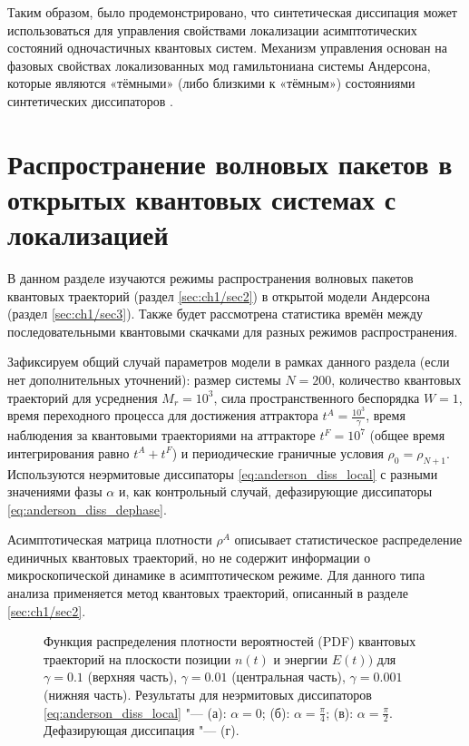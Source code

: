Таким образом, было продемонстрировано, что синтетическая диссипация может использоваться для управления свойствами локализации асимптотических состояний одночастичных квантовых систем. Механизм управления основан на фазовых свойствах локализованных мод гамильтониана системы Андерсона, которые являются  «тёмными» (либо близкими к «тёмным») состояниями синтетических диссипаторов \cite{Vershinina2017}.

\section{Распространение волновых пакетов в открытых квантовых системах с локализацией}\label{sec:ch1/prb_jump}
В данном разделе изучаются режимы распространения волновых пакетов квантовых траекторий \cite{Dalibard1992, Dum1992, Plenio1998} (раздел \cref{sec:ch1/sec2}) в открытой модели Андерсона (раздел \cref{sec:ch1/sec3}). Также будет рассмотрена статистика времён между последовательными квантовыми скачками для разных режимов распространения.

Зафиксируем общий случай параметров модели в рамках данного раздела (если нет дополнительных уточнений): размер системы \(N=200\), количество квантовых траекторий для усреднения \(M_r=10^3\), сила пространственного беспорядка \(W=1\), время переходного процесса для достижения аттрактора \(t^A = \frac{10^3}{\gamma}\), время наблюдения за квантовыми траекториями на аттракторе \(t^F = 10^7\) (общее время интегрирования равно \(t^A + t^F\)) и периодические граничные условия \(\rho_0 = \rho_{N+1}\). Используются неэрмитовые диссипаторы \cref{eq:anderson_diss_local} с разными значениями фазы \(\alpha\) и, как контрольный случай, дефазирующие диссипаторы \cref{eq:anderson_diss_dephase}.

Асимптотическая матрица плотности \(\rho^A\) описывает статистическое распределение единичных квантовых траекторий, но не содержит информации о микроскопической динамике в асимптотическом режиме. Для данного типа анализа применяется метод квантовых траекторий, описанный в разделе \cref{sec:ch1/sec2}.

\begin{figure}[ht]
	\legend{}
	\caption[Этот текст попадает в названия рисунков в списке рисунков]
	{
		Функция распределения плотности вероятностей (PDF) квантовых траекторий на плоскости позиции \(n(t)\) и энергии \(E(t))\) для \(\gamma=0.1\) (верхняя часть),  \(\gamma=0.01\) (центральная часть),  \(\gamma=0.001\) (нижняя часть). Результаты для неэрмитовых диссипаторов \cref{eq:anderson_diss_local} "--- (а): \(\alpha=0\); (б): \(\alpha=\frac{\pi}{4}\); (в): \(\alpha=\frac{\pi}{2}\). Дефазирующая диссипация "--- (г).
	}
	\label{fig:anderson_prb_1}
\end{figure}

